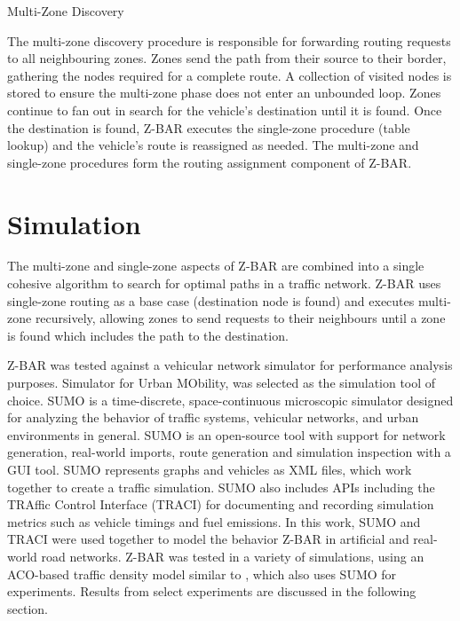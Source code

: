 \documentclass[conference]{IEEEtran}
\begin{document}
\begin{algorithm}[H]
  \caption{Multi-Zone Discovery}
  \label{route_discovery_multi_zone}
  \begin{algorithmic}[1]
      \EndFor
    \EndFor
  \EndFor
  \EndProcedure
  \end{algorithmic}
\end{algorithm}

The multi-zone discovery procedure is responsible for forwarding routing requests to all neighbouring zones. Zones send the path from their source to their border, gathering the nodes required for a complete route. A collection of visited nodes is stored to ensure the multi-zone phase does not enter an unbounded loop. Zones continue to fan out in search for the vehicle's destination until it is found. Once the destination is found, Z-BAR executes the single-zone procedure (table lookup) and the vehicle's route is reassigned as needed. The multi-zone and single-zone procedures form the routing assignment component of Z-BAR.

\section{Simulation}

The multi-zone and single-zone aspects of Z-BAR are combined into a single cohesive algorithm to search for optimal paths in a traffic network. Z-BAR uses single-zone routing as a base case (destination node is found) and executes multi-zone recursively, allowing zones to send requests to their neighbours until a zone is found which includes the path to the destination. %


Z-BAR was tested against a vehicular network simulator for performance analysis purposes. Simulator for Urban MObility, \cite{sumo} was selected as the simulation tool of choice. SUMO is a time-discrete, space-continuous microscopic simulator designed for analyzing the behavior of traffic systems, vehicular networks, and urban environments in general. SUMO is an open-source tool with support for network generation, real-world imports, route generation and simulation inspection with a GUI tool. SUMO represents graphs and vehicles as XML files, which work together to create a traffic simulation. SUMO also includes APIs including the TRAffic Control Interface (TRACI) \cite{traci} for documenting and recording simulation metrics such as vehicle timings and fuel emissions. In this work, SUMO and TRACI were used together to model the behavior Z-BAR in artificial and real-world road networks. Z-BAR was tested in a variety of simulations, using an ACO-based traffic density model similar to \cite{iaco}, which also uses SUMO for experiments. Results from select experiments are discussed in the following section.
\end{document}
